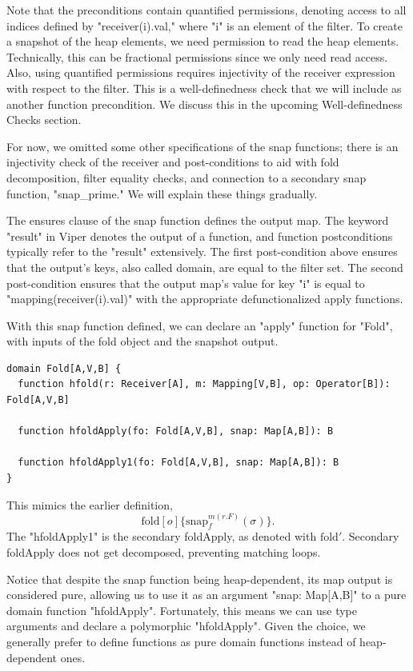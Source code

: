 \documentclass[msc,oneside]{ubcthesis}
\theoremstyle{definition}
\begin{document}
Note that the preconditions contain quantified permissions, denoting access to all indices defined by "receiver(i).val," where "i" is an element of the filter. To create a snapshot of the heap elements, we need permission to read the heap elements. Technically, this can be fractional permissions since we only need read access. Also, using quantified permissions requires injectivity of the receiver expression with respect to the filter. This is a well-definedness check that we will include as another function precondition. We discuss this in the upcoming Well-definedness Checks section. 

For now, we omitted some other specifications of the snap functions; there is an injectivity check of the receiver and post-conditions to aid with fold decomposition, filter equality checks, and connection to a secondary snap function, "snap_prime." We will explain these things gradually.

The ensures clause of the snap function defines the output map. The keyword "result" in Viper denotes the output of a function, and function postconditions typically refer to the "result" extensively. The first post-condition above ensures that the output's keys, also called domain, are equal to the filter set. The second post-condition ensures that the output map's value for key "i" is equal to "mapping(receiver(i).val)" with the appropriate defunctionalized apply functions.

With this snap function defined, we can declare an "apply" function for "Fold", with inputs of the fold object and the snapshot output.
\begin{lstlisting}
domain Fold[A,V,B] {
  function hfold(r: Receiver[A], m: Mapping[V,B], op: Operator[B]): Fold[A,V,B]

  function hfoldApply(fo: Fold[A,V,B], snap: Map[A,B]): B

  function hfoldApply1(fo: Fold[A,V,B], snap: Map[A,B]): B
}
\end{lstlisting}
This mimics the earlier definition,
$$\textrm{fold}[o]\{\textrm{snap}^{m(r.F)}_{f}(\sigma)\}.$$ The "hfoldApply1" is the secondary foldApply, as denoted with $\textrm{fold}'$. Secondary foldApply does not get decomposed, preventing matching loops. 

Notice that despite the snap function being heap-dependent, its map output is considered pure, allowing us to use it as an argument "snap: Map[A,B]" to a pure domain function "hfoldApply". Fortunately, this means we can use type arguments and declare a polymorphic "hfoldApply". Given the choice, we generally prefer to define functions as pure domain functions instead of heap-dependent ones. 
\end{document}
